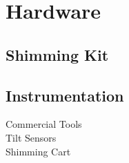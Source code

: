 \section{Hardware}
\label{sec:Hardware}
\subsection{Shimming Kit}
\subsection{Instrumentation}
Commercial Tools\\
Tilt Sensors \\
Shimming Cart\\
